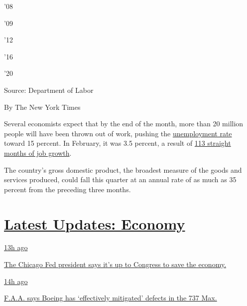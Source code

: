 '08

'09

'12

'16

'20

Source: Department of Labor

By The New York Times

Several economists expect that by the end of the month, more than 20
million people will have been thrown out of work, pushing the
\href{https://www.nytimes.com/2020/04/16/business/economy/unemployment-numbers-coronavirus.html}{unemployment
rate} toward 15 percent. In February, it was 3.5 percent, a result of
\href{https://www.nytimes.com/2020/04/03/business/economy/coronavirus-jobs-report.html}{113
straight months of job growth}.

The country's gross domestic product, the broadest measure of the goods
and services produced, could fall this quarter at an annual rate of as
much as 35 percent from the preceding three months.

\hypertarget{latest-updates-economy}{%
\section{\texorpdfstring{\href{https://www.nytimes.com/live/2020/08/03/business/stock-market-today-coronavirus?action=click\&pgtype=Article\&state=default\&region=MAIN_CONTENT_1\&context=storylines_live_updates}{Latest
Updates:
Economy}}{Latest Updates: Economy}}\label{latest-updates-economy}}

\href{https://www.nytimes.com/live/2020/08/03/business/stock-market-today-coronavirus?action=click\&pgtype=Article\&state=default\&region=MAIN_CONTENT_1\&context=storylines_live_updates\#the-chicago-fed-president-says-its-up-to-congress-to-save-the-economy}{13h
ago}

\href{https://www.nytimes.com/live/2020/08/03/business/stock-market-today-coronavirus?action=click\&pgtype=Article\&state=default\&region=MAIN_CONTENT_1\&context=storylines_live_updates\#the-chicago-fed-president-says-its-up-to-congress-to-save-the-economy}{The
Chicago Fed president says it's up to Congress to save the economy.}

\href{https://www.nytimes.com/live/2020/08/03/business/stock-market-today-coronavirus?action=click\&pgtype=Article\&state=default\&region=MAIN_CONTENT_1\&context=storylines_live_updates\#faa-says-boeing-has-effectively-mitigated-defects-in-the-737-max}{14h
ago}

\href{https://www.nytimes.com/live/2020/08/03/business/stock-market-today-coronavirus?action=click\&pgtype=Article\&state=default\&region=MAIN_CONTENT_1\&context=storylines_live_updates\#faa-says-boeing-has-effectively-mitigated-defects-in-the-737-max}{F.A.A.
says Boeing has `effectively mitigated' defects in the 737 Max.}

